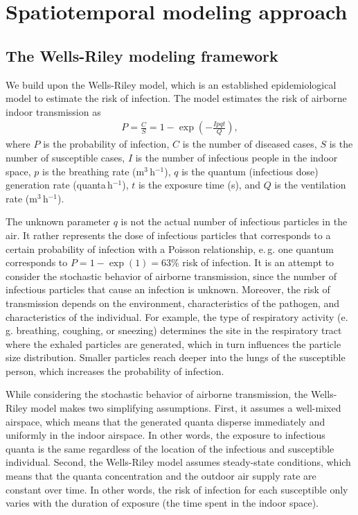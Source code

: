 \documentclass[fleqn,11pt]{wlscirep_supp}
\newcommand\eg{e.\,g.\xspace}
\begin{document}
\clearpage

\section{Spatiotemporal modeling approach}\label{sec:spattemp-model}

\subsection{The Wells-Riley modeling framework}

We build upon the Wells-Riley model\cite{Riley1961Book}, which is an established epidemiological model to estimate the risk of infection. The model estimates the risk of airborne indoor transmission as
\begin{align}
    P = \frac{C}{S} = 1 - \exp \left(-\frac{Ipqt}{Q}\right),
\end{align}
where $P$ is the probability of infection, $C$ is the number of diseased cases, $S$ is the number of susceptible cases, $I$ is the number of infectious people in the indoor space, $p$ is the breathing rate (m$^3$\,h$^{-1}$), $q$ is the quantum (infectious dose) generation rate (quanta\,h$^{-1}$), $t$ is the exposure time (s), and $Q$ is the ventilation rate (m$^3$\,h$^{-1}$).

The unknown parameter $q$ is not the actual number of infectious particles in the air. It rather represents the dose of infectious particles that corresponds to a certain probability of infection with a Poisson relationship, \eg one quantum corresponds to $P = 1 - \exp (1) = 63\%$ risk of infection\cite{Rudnick2003IndoorAir}. It is an attempt to consider the stochastic behavior of airborne transmission, since the number of infectious particles that cause an infection is unknown. Moreover, the risk of transmission depends on the environment, characteristics of the pathogen, and characteristics of the individual. For example, the type of respiratory activity (\eg breathing, coughing, or sneezing) determines the site in the respiratory tract where the exhaled particles are generated, which in turn influences the particle size distribution\cite{Wei2016AMJIC}. Smaller particles reach deeper into the lungs of the susceptible person\cite{Wang2021Science}, which increases the probability of infection. 

While considering the stochastic behavior of airborne transmission, the Wells-Riley model makes two simplifying assumptions. First, it assumes a well-mixed airspace, which means that the generated quanta disperse immediately and uniformly in the indoor airspace. In other words, the exposure to infectious quanta is the same regardless of the location of the infectious and susceptible individual. Second, the Wells-Riley model assumes steady-state conditions, which means that the quanta concentration and the outdoor air supply rate are constant over time. In other words, the risk of infection for each susceptible only varies with the duration of exposure (the time spent in the indoor space). 
\end{document}
